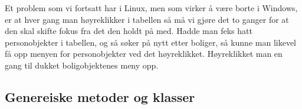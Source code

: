 Et problem som vi fortsatt har i Linux, men som virker å være borte i Windows, er at hver gang man høyreklikker i tabellen så må vi gjøre det to ganger for at den skal skifte fokus fra det den holdt på med. Hadde man feks hatt personobjekter i tabellen, og så søker på nytt etter boliger, så kunne man likevel få opp menyen for personobjekter ved det høyreklikket. Høyreklikket man en gang til dukket boligobjektenes meny opp.

\subsection{Genereiske metoder og klasser}
